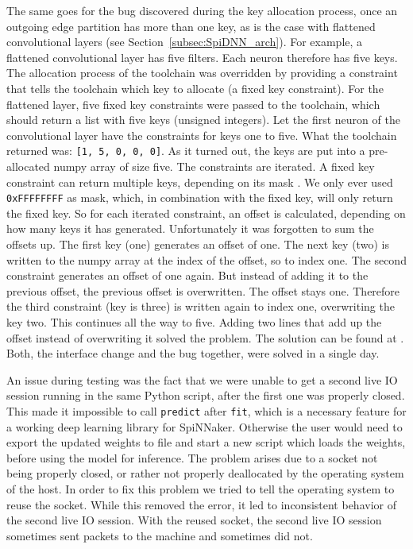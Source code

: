 \documentclass[]{article}
\begin{document}
The same goes for the bug discovered during the key allocation
process, once an outgoing edge partition has more than one key,
as is the case with flattened convolutional layers (see
Section~\ref{subsec:SpiDNN_arch}).
For example, a flattened convolutional layer has five filters.
Each neuron therefore has five keys.
The allocation process of the toolchain was overridden by providing
a constraint that tells the toolchain which key to allocate
(a fixed key constraint).
For the flattened layer, five fixed key constraints were passed to
the toolchain, which should return a list with five keys (unsigned
integers).
Let the first neuron of the convolutional layer have the constraints
for keys one to five.
What the toolchain returned was: \texttt{[1, 5, 0, 0, 0]}.
As it turned out, the keys are put into a pre-allocated numpy
array \citep{van_der_walt_2011} of size five.
The constraints are iterated.
A fixed key constraint can return multiple keys, depending on its
mask \citep{furber_et_al_2020}.
We only ever used \texttt{0xFFFFFFFF} as mask, which, in combination
with the fixed key, will only return the fixed key.
So for each iterated constraint, an offset is calculated, depending
on how many keys it has generated.
Unfortunately it was forgotten to sum the offsets up.
The first key (one) generates an offset of one.
The next key (two) is written to the numpy array at the index of
the offset, so to index one.
The second constraint generates an offset of one again.
But instead of adding it to the previous offset, the previous offset
is overwritten.
The offset stays one.
Therefore the third constraint (key is three) is written again to
index one, overwriting the key two.
This continues all the way to five.
Adding two lines that add up the offset instead of overwriting it
solved the problem.
The solution can be found at \citet{fassbender_2020c}.
Both, the interface change and the bug together, were solved in
a single day.

An issue during testing was the
fact that we were unable to get a second live IO session running in
the same Python script, after the first one was properly closed.
This made it impossible to call \texttt{predict} after \texttt{fit},
which is a necessary feature for a working deep learning library for
SpiNNaker.
Otherwise the user would need to export the updated weights to file
and start a new script which loads the weights, before using the
model for inference.
The problem arises due to a socket not being properly closed, or
rather not properly deallocated by the operating system of the host.
In order to fix this problem we tried to tell the operating system to
reuse the socket.
While this removed the error, it led to inconsistent behavior of the
second live IO session.
With the reused socket, the second live IO session sometimes sent
packets to the machine and sometimes did not.
\end{document}
